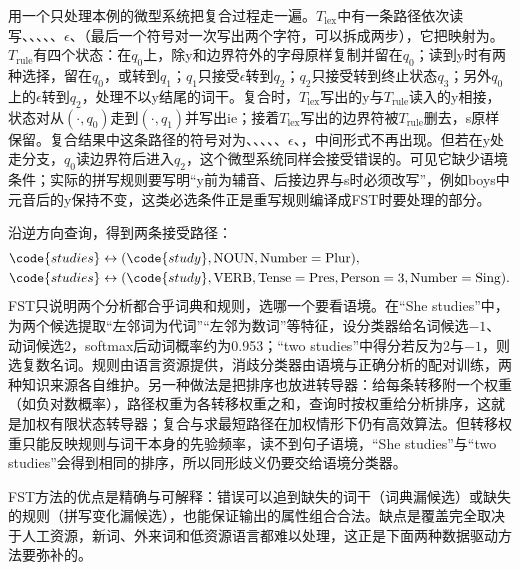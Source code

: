 用一个只处理本例的微型系统把复合过程走一遍。$T_{\mathrm{lex}}$中有一条路径依次读写、、、、、$\epsilon$、（最后一个符号对一次写出两个字符，可以拆成两步），它把映射为。$T_{\mathrm{rule}}$有四个状态：在$q_0$上，除y和边界符外的字母原样复制并留在$q_0$；读到y时有两种选择，留在$q_0$，或转到$q_1$；$q_1$只接受\code{\^{}:}$\epsilon$转到$q_2$；$q_2$只接受转到终止状态$q_3$；另外$q_0$上的\code{\^{}:}$\epsilon$转到$q_2$，处理不以y结尾的词干。复合时，$T_{\mathrm{lex}}$写出的y与$T_{\mathrm{rule}}$读入的y相接，状态对从$(\cdot,q_0)$走到$(\cdot,q_1)$并写出ie；接着$T_{\mathrm{lex}}$写出的边界符被$T_{\mathrm{rule}}$删去，s原样保留。复合结果中这条路径的符号对为、、、、、$\epsilon$、，中间形式不再出现。但若在y处走分支，$q_0$读边界符后进入$q_2$，这个微型系统同样会接受错误的。可见它缺少语境条件；实际的拼写规则要写明“y前为辅音、后接边界与s时必须改写”，例如boys中元音后的y保持不变，这类必选条件正是重写规则编译成FST时要处理的部分。

沿逆方向查询，得到两条接受路径：
\[
\begin{aligned}
 \code{studies}&\leftrightarrow
   (\code{study},\mathrm{NOUN},\mathrm{Number=Plur}),\\
 \code{studies}&\leftrightarrow
   (\code{study},\mathrm{VERB},\mathrm{Tense=Pres},
                       \mathrm{Person=3},\mathrm{Number=Sing}).
\end{aligned}
\]
FST只说明两个分析都合乎词典和规则，选哪一个要看语境。在“She studies”中，为两个候选提取“左邻词为代词”“左邻为数词”等特征，设分类器给名词候选$-1$、动词候选2，softmax后动词概率约为0.953；“two studies”中得分若反为2与$-1$，则选复数名词。规则由语言资源提供，消歧分类器由语境与正确分析的配对训练，两种知识来源各自维护。另一种做法是把排序也放进转导器：给每条转移附一个权重（如负对数概率），路径权重为各转移权重之和，查询时按权重给分析排序，这就是加权有限状态转导器；复合与求最短路径在加权情形下仍有高效算法。但转移权重只能反映规则与词干本身的先验频率，读不到句子语境，“She studies”与“two studies”会得到相同的排序，所以同形歧义仍要交给语境分类器。

FST方法的优点是精确与可解释：错误可以追到缺失的词干（词典漏候选）或缺失的规则（拼写变化漏候选），也能保证输出的属性组合合法。缺点是覆盖完全取决于人工资源，新词、外来词和低资源语言都难以处理，这正是下面两种数据驱动方法要弥补的。

